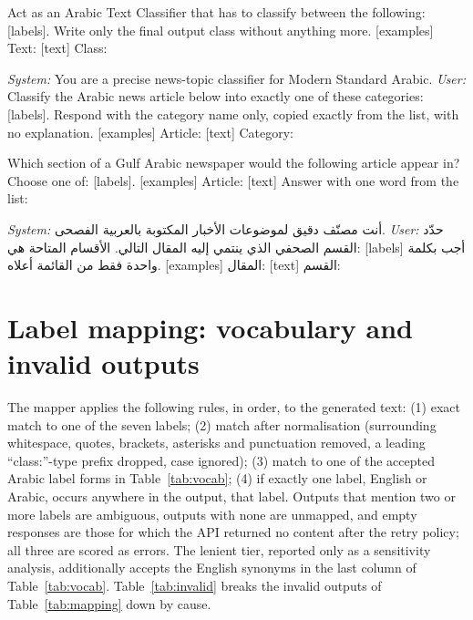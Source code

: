 \documentclass[preprint,12pt,authoryear]{elsarticle}
\newcommand{\RTL}[1]{\foreignlanguage{arabic}{#1}}
\newif\ifrevmarkup
\DeclareRobustCommand{\rev}[1]{\ifrevmarkup{\color{blue}#1}\else#1\fi}
\newcommand{\revblock}{\ifrevmarkup\color{blue}\fi}
\begin{document}
\begin{description}[leftmargin=1.2cm,style=nextline]
\item[\texttt{en\_v1} (original wording)] \rev{Act as an Arabic Text Classifier that has to classify between the following: [labels]. Write only the final output class without anything more. [examples] Text: [text] Class:}
\item[\texttt{en\_v2} (primary)] \rev{\textit{System:} You are a precise news-topic classifier for Modern Standard Arabic. \textit{User:} Classify the Arabic news article below into exactly one of these categories: [labels]. Respond with the category name only, copied exactly from the list, with no explanation. [examples] Article: [text] Category:}
\item[\texttt{en\_v3}] \rev{Which section of a Gulf Arabic newspaper would the following article appear in? Choose one of: [labels]. [examples] Article: [text] Answer with one word from the list:}
\item[\texttt{ar\_v1}] \rev{}
\item[\texttt{ar\_v2}] \rev{\textit{System:} \RTL{أنت مصنّف دقيق لموضوعات الأخبار المكتوبة بالعربية الفصحى.} \textit{User:} \RTL{حدّد القسم الصحفي الذي ينتمي إليه المقال التالي. الأقسام المتاحة هي: [labels] أجب بكلمة واحدة فقط من القائمة أعلاه. [examples] المقال: [text] القسم:}}
\end{description}

\section{\rev{Label mapping: vocabulary and invalid outputs}}
\label{app:mapping}

\rev{The mapper applies the following rules, in order, to the generated text: (1) exact match to one of the seven labels; (2) match after normalisation (surrounding whitespace, quotes, brackets, asterisks and punctuation removed, a leading ``class:''-type prefix dropped, case ignored); (3) match to one of the accepted Arabic label forms in Table~\ref{tab:vocab}; (4) if exactly one label, English or Arabic, occurs anywhere in the output, that label. Outputs that mention two or more labels are ambiguous, outputs with none are unmapped, and empty responses are those for which the API returned no content after the retry policy; all three are scored as errors. The lenient tier, reported only as a sensitivity analysis, additionally accepts the English synonyms in the last column of Table~\ref{tab:vocab}. Table~\ref{tab:invalid} breaks the invalid outputs of Table~\ref{tab:mapping} down by cause.}

{\revblock}

{\revblock}



\end{document}
